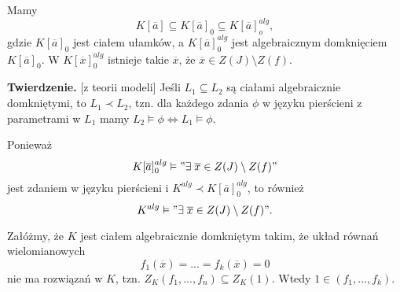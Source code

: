 Mamy 
$$K[\overline{a}]\subseteq K[\overline{a}]_0\subseteq K[\overline{a}]_o^{alg},$$ gdzie $K[\overline{a}]_0$ jest ciałem ułamków, a $K[\overline{a}]_0^{alg}$ jest algebraicznym domknięciem $K[\overline{a}]_0$. W $K[\overline{x}]_0^{alg}$ istnieje takie $\overline{x}$, że $\overline{x}\in Z(J)\setminus Z(f)$. 

\textbf{\large\color{orange}Twierdzenie.} [z teorii modeli] Jeśli $L_1\subseteq L_2$ są ciałami algebraicznie domkniętymi, to $L_1\prec L_2$, tzn. dla każdego zdania $\phi$ w języku pierścieni z parametrami w $L_1$ mamy $L_2\vDash \phi\iff L_1\vDash \phi$.

Ponieważ
$$K[\overline{a}]_0^{alg}\vDash "\exists\;\overline{x}\in Z(J)\setminus Z(f)"$$
jest zdaniem w języku pierścieni i $K^{alg}\prec K[\overline{a}]_0^{alg}$, to również
$$K^{alg}\vDash "\exists\;\overline{x}\in Z(J)\setminus Z(f)".$$

\begin{remark}
  Załóżmy, że $K$ jest ciałem algebraicznie domkniętym takim, że układ równań wielomianowych 
  $$f_1(\overline{x})=...=f_k(\overline{x})=0$$
  nie ma rozwiązań w $K$, tzn. $Z_K(f_1,...,f_n)\subseteq Z_K(1)$. Wtedy $1\in (f_1,...,f_k)$.
\end{remark}
